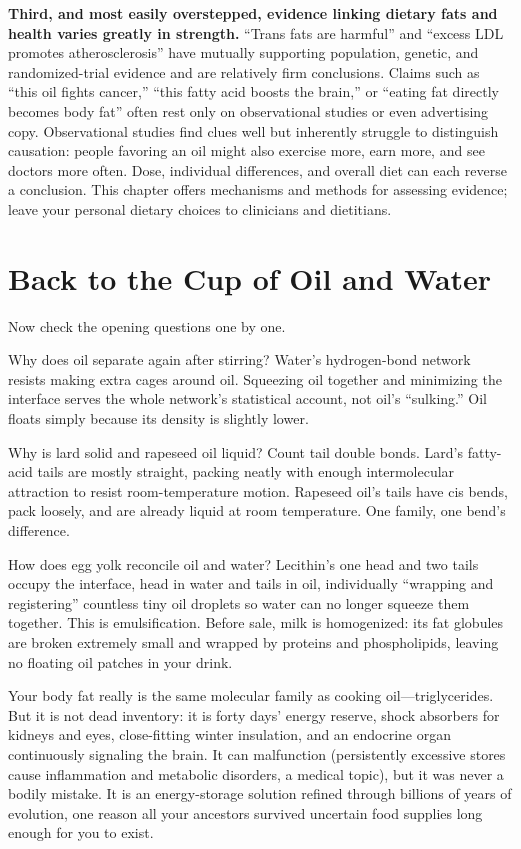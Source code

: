 \textbf{Third, and most easily overstepped, evidence linking dietary fats and health varies greatly in strength.} ``Trans fats are harmful'' and ``excess LDL promotes atherosclerosis'' have mutually supporting population, genetic, and randomized-trial evidence and are relatively firm conclusions. Claims such as ``this oil fights cancer,'' ``this fatty acid boosts the brain,'' or ``eating fat directly becomes body fat'' often rest only on observational studies or even advertising copy. Observational studies find clues well but inherently struggle to distinguish causation: people favoring an oil might also exercise more, earn more, and see doctors more often. Dose, individual differences, and overall diet can each reverse a conclusion. This chapter offers mechanisms and methods for assessing evidence; leave your personal dietary choices to clinicians and dietitians.

\section{Back to the Cup of Oil and Water}

Now check the opening questions one by one.

Why does oil separate again after stirring? Water's hydrogen-bond network resists making extra cages around oil. Squeezing oil together and minimizing the interface serves the whole network's statistical account, not oil's ``sulking.'' Oil floats simply because its density is slightly lower.

Why is lard solid and rapeseed oil liquid? Count tail double bonds. Lard's fatty-acid tails are mostly straight, packing neatly with enough intermolecular attraction to resist room-temperature motion. Rapeseed oil's tails have cis bends, pack loosely, and are already liquid at room temperature. One family, one bend's difference.

How does egg yolk reconcile oil and water? Lecithin's one head and two tails occupy the interface, head in water and tails in oil, individually ``wrapping and registering'' countless tiny oil droplets so water can no longer squeeze them together. This is emulsification. Before sale, milk is homogenized: its fat globules are broken extremely small and wrapped by proteins and phospholipids, leaving no floating oil patches in your drink.

Your body fat really is the same molecular family as cooking oil---triglycerides. But it is not dead inventory: it is forty days' energy reserve, shock absorbers for kidneys and eyes, close-fitting winter insulation, and an endocrine organ continuously signaling the brain. It can malfunction (persistently excessive stores cause inflammation and metabolic disorders, a medical topic), but it was never a bodily mistake. It is an energy-storage solution refined through billions of years of evolution, one reason all your ancestors survived uncertain food supplies long enough for you to exist.

